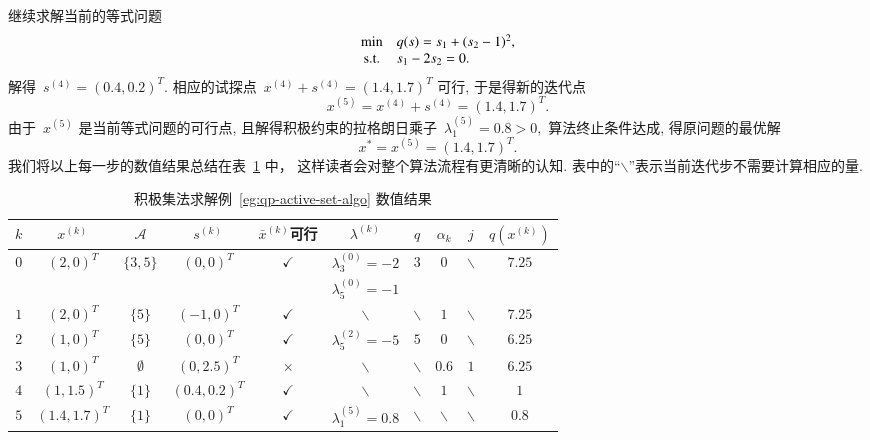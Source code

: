 \begin{exam}
继续求解当前的等式问题
\begin{equation*}
\begin{array}{cl}
\min & q({s}) = s_1 + (s_2 - 1)^2, \\
{\rm s.t.} & s_1 - 2s_2 = 0.
\end{array}
\end{equation*}
解得~${s}^{(4)} = (0.4, 0.2)^T.$ 相应的试探点~${x}^{(4)} + {s}^{(4)} = (1.4, 1.7)^T$ 可行, 于是得新的迭代点
\begin{equation*}
{x}^{(5)} = {x}^{(4)} + {s}^{(4)} = (1.4, 1.7)^T.
\end{equation*}
由于~${x}^{(5)}$ 是当前等式问题的可行点, 且解得积极约束的拉格朗日乘子~$\lambda_1^{(5)} = 0.8 > 0,$ 算法终止条件达成, 得原问题的最优解
\begin{equation*}
{x}^* = {x}^{(5)} = (1.4, 1.7)^T.
\end{equation*}
我们将以上每一步的数值结果总结在表~\ref{tab:active-set-eg} 中， 这样读者会对整个算法流程有更清晰的认知. 表中的``$\backslash$''表示当前迭代步不需要计算相应的量.
\begin{table}[H]
    \caption{积极集法求解例~\ref{eg:qp-active-set-algo} 数值结果}
    \label{tab:active-set-eg}
    \centering
    \begin{tabular}{cccccccccc}
    \hline
    $k$ & ${x}^{(k)}$ & $\mathcal{A}$ & ${s}^{(k)}$ & $\bar{{x}}^{(k)}$可行 & ${\lambda}^{(k)}$ & $q$ & $\alpha_k$ & $j$ & $q({x}^{(k)})$ \\
    \hline
    \multirow{2}{*}{$0$} & \multirow{2}{*}{$(2, 0)^T$} & \multirow{2}{*}{$\{ 3, 5 \}$} & \multirow{2}{*}{$(0, 0)^T$} & \multirow{2}{*}{$\checkmark$} & $\lambda_3^{(0)} = -2$ & \multirow{2}{*}{$3$} & \multirow{2}{*}{$0$} & \multirow{2}{*}{$\backslash$} & \multirow{2}{*}{$7.25$} \\
    & & & & & $\lambda_5^{(0)} = -1$ & & & \\
    $1$ & $(2, 0)^T$ & $\{ 5 \}$ & $(-1, 0)^T$ & $\checkmark$ & $\backslash$ & $\backslash$ & $1$ & $\backslash$ & $7.25$ \\
    $2$ & $(1, 0)^T$ & $\{ 5 \}$ & $(0, 0)^T$ & $\checkmark$ & $\lambda_5^{(2)} = -5$ & $5$ & $0$ & $\backslash$ & $6.25$ \\
    $3$ & $(1, 0)^T$ & $\emptyset$ & $(0, 2.5)^T$ & $\times$ & $\backslash$ & $\backslash$ & $0.6$ & $1$ & $6.25$ \\
    $4$ & $(1, 1.5)^T$ & $\{ 1 \}$ & $(0.4, 0.2)^T$ & $\checkmark$ & $\backslash$ & $\backslash$ & $1$ & $\backslash$ & $1$ \\
    $5$ & $(1.4, 1.7)^T$ & $\{ 1 \}$ & $(0, 0)^T$ & $\checkmark$ & $\lambda_1^{(5)} = 0.8$ & $\backslash$ & $\backslash$ & $\backslash$ & $0.8$ \\
    \hline
    \end{tabular}
\end{table}
\end{exam}
